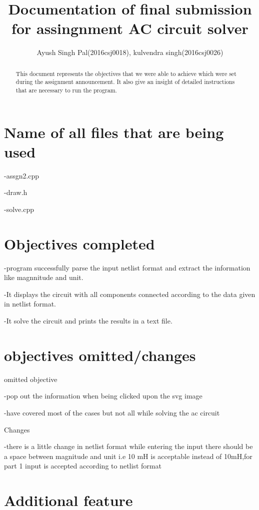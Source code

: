 \documentclass[]{article}
\begin{document}
\title{Documentation of final submission for assingnment AC circuit solver}
\author{Ayush Singh Pal(2016csj0018),
kulvendra singh(2016csj0026)
}
\maketitle

\begin{abstract}
This document represents the objectives that we were able to achieve which were set during the assignment announcement.
It also give an insight of detailed instructions that are necessary to run the program.
\end{abstract}


\section{Name of all files that are being used}

-assgn2.cpp

-draw.h

-solve.cpp
 
\section{Objectives completed}

-program successfully parse the input netlist format and extract the information like magnnitude and unit.

-It displays the circuit with all components connected according to the data given in netlist format.

-It solve the circuit and prints the results in a text file.

\section{objectives omitted/changes}

omitted objective

-pop out the information when being clicked upon the svg image

-have covered most of the cases but not all  while solving the ac circuit

Changes


-there is a little change in netlist format while entering the input there should be a space between magnitude and unit i.e 10 mH is acceptable instead of 10mH,for part 1 input is accepted according to netlist format

\section{Additional feature}
\end{document}

